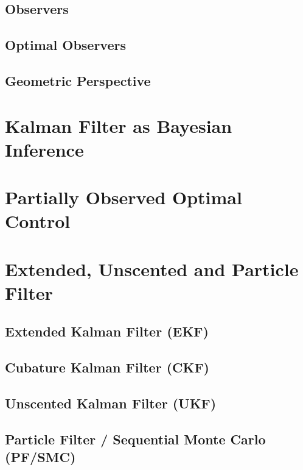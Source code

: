 		\subsection{Observers} %

		\subsection{Optimal Observers} %

		\subsection{Geometric Perspective} %

	\section{Kalman Filter as Bayesian Inference} %

	\section{Partially Observed Optimal Control} %

	\section{Extended, Unscented and Particle Filter} %

		\subsection{Extended Kalman Filter (EKF)} %

		\subsection{Cubature Kalman Filter (CKF)} %

		\subsection{Unscented Kalman Filter (UKF)} %

		\subsection{Particle Filter / Sequential Monte Carlo (PF/SMC)} %

